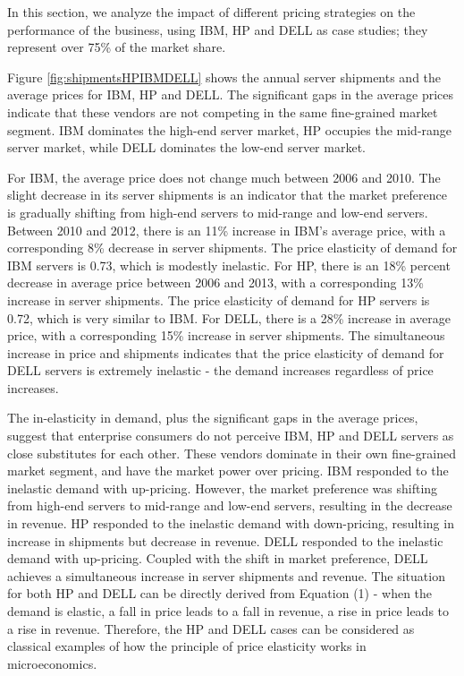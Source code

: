\documentclass[10pt,journal,cspaper,compsoc]{IEEEtran}
\begin{document}
In this section, we analyze the impact of different pricing strategies on the performance of the business, using IBM, HP and DELL as case studies; they represent over 75\% of the market share. %

Figure \ref{fig:shipmentsHPIBMDELL} shows the annual server shipments and the average prices for IBM, HP and DELL. The significant gaps in the average prices indicate that these vendors are not competing in the same fine-grained market segment. IBM dominates the high-end server market, HP occupies the mid-range server market, while DELL dominates the low-end server market. 

For IBM, the average price does not change much between 2006 and 2010. The slight decrease in its server shipments is an indicator that the market preference is gradually shifting from high-end servers to mid-range and low-end servers. Between 2010 and 2012, there is an 11\% increase in IBM's average price, with a corresponding 8\% decrease in server shipments. The price elasticity of demand for IBM servers is 0.73, which is modestly inelastic. For HP, there is an 18\% percent decrease in average price between 2006 and 2013, with a corresponding 13\% increase in server shipments. The price elasticity of demand for HP servers is 0.72, which is very similar to IBM. For DELL, there is a 28\% increase in average price, with a corresponding 15\% increase in server shipments. The simultaneous increase in price and shipments indicates that the price elasticity of demand for DELL servers is extremely inelastic - the demand increases regardless of price increases. 

The in-elasticity in demand, plus the significant gaps in the average prices, suggest that enterprise consumers do not perceive IBM, HP and DELL servers as close substitutes for each other. These vendors dominate in their own fine-grained market segment, and have the market power over pricing. IBM responded to the inelastic demand with up-pricing. However, the market preference was shifting from high-end servers to mid-range and low-end servers, resulting in the decrease in revenue. HP responded to the inelastic demand with down-pricing, resulting in increase in shipments but decrease in revenue. DELL responded to the inelastic demand with up-pricing. Coupled with the shift in market preference, DELL achieves a simultaneous increase in server shipments and revenue. The situation for both HP and DELL can be directly derived from Equation (1) - when the demand is elastic, a fall in price leads to a fall in revenue, a rise in price leads to a rise in revenue. Therefore, the HP and DELL cases can be considered as classical examples of how the principle of price elasticity works in microeconomics.
\end{document}
